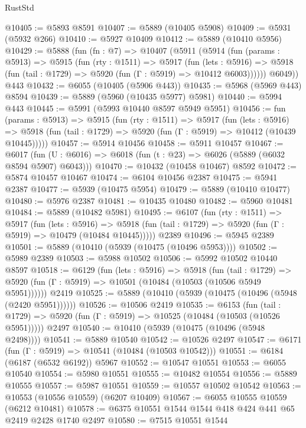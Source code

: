 \begin{lexlean}{RustStd}
\begin{coremodule}
@10405 := @5893 @8591
@10407 := @5889 (@10405 @5908)
@10409 := @5931 (@5932 @266)
@10410 := @5927 @10409
@10412 := @5889 (@10410 @5956)
@10429 := @5888
    (fun (fn : @7) =>
    @10407
      (@5911
        (@5914
          (fun (params : @5913) =>
          @5915
            (fun (rty : @1511) =>
            @5917
              (fun (lets : @5916) =>
              @5918 (fun (tail : @1729) => @5920 (fun (Γ : @5919) => @10412 @6003))))))
        @6049))
    @443
@10432 := @6055 (@10405 (@5906 @443))
@10435 := @5968 (@5969 @443) @8594
@10439 := @5889 (@5960 (@10435 @5977) @5981)
@10440 := @5994 @443
@10445 := @5991 (@5993 @10440 @8597 @5949 @5951)
@10456 := fun (params : @5913) =>
  @5915
    (fun (rty : @1511) =>
    @5917
      (fun (lets : @5916) =>
      @5918 (fun (tail : @1729) => @5920 (fun (Γ : @5919) => @10412 (@10439 @10445)))))
@10457 := @5914 @10456
@10458 := @5911 @10457
@10467 := @6017
    (fun (U : @6016) => @6018 (fun (t : @23) => @6026 (@5889 (@6032 @8594 @5907) @6043)))
@10470 := @10432 (@10458 @10467) @8592
@10472 := @5874 @10457 @10467
@10474 := @6104 @10456 @2387
@10475 := @5941 @2387
@10477 := @5939 (@10475 @5954)
@10479 := @5889 (@10410 @10477)
@10480 := @5976 @2387
@10481 := @10435 @10480
@10482 := @5960 @10481
@10484 := @5889 (@10482 @5981)
@10495 := @6107
    (fun (rty : @1511) =>
    @5917
      (fun (lets : @5916) =>
      @5918 (fun (tail : @1729) => @5920 (fun (Γ : @5919) => @10479 (@10484 @10445)))))
    @2389
@10496 := @5945 @2389
@10501 := @5889 (@10410 (@5939 (@10475 (@10496 @5953))))
@10502 := @5989 @2389
@10503 := @5988 @10502
@10506 := @5992 @10502 @10440 @8597
@10518 := @6129
    (fun (lets : @5916) =>
    @5918
      (fun (tail : @1729) =>
      @5920 (fun (Γ : @5919) => @10501 (@10484 (@10503 (@10506 @5949 @5951))))))
    @2419
@10525 := @5889 (@10410 (@5939 (@10475 (@10496 (@5948 (@2420 @5951))))))
@10526 := @10506 @2419
@10535 := @6153
    (fun (tail : @1729) => @5920 (fun (Γ : @5919) => @10525 (@10484 (@10503 (@10526 @5951)))))
    @2497
@10540 := @10410 (@5939 (@10475 (@10496 (@5948 @2498))))
@10541 := @5889 @10540
@10542 := @10526 @2497
@10547 := @6171 (fun (Γ : @5919) => @10541 (@10484 (@10503 @10542)))
@10551 := @6184 (@6187 (@6532 @6192)) @5967
@10552 := @10547 @10551
@10553 := @6055 @10540
@10554 := @5980 @10551
@10555 := @10482 @10554
@10556 := @5889 @10555
@10557 := @5987 @10551
@10559 := @10557 @10502 @10542
@10563 := @10553 (@10556 @10559) (@6207 @10409)
@10567 := @6055 @10555 @10559 (@6212 @10481)
@10578 := @6375 @10551 @1544 @1544 @418 @424 @441 @65 @2419 @2428 @1740 @2497
@10580 := @7515 @10551 @1544

\end{coremodule}
\end{lexlean}
